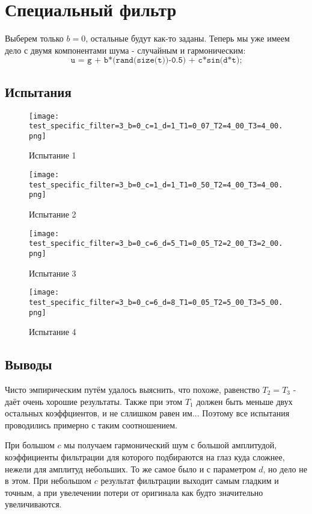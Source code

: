 \section{Специальный фильтр}
Выберем только $b=0$, остальные будут как-то заданы. Теперь мы уже имеем дело с двумя компонентами шума - случайным и гармоническим:
$$
\texttt{u = g + b*(rand(size(t))-0.5) + c*sin(d*t);}
$$
\subsection{Испытания}

\begin{figure}[ht]
    \centering
    \texttt{[image: test\_specific\_filter=3\_b=0\_c=1\_d=1\_T1=0\_07\_T2=4\_00\_T3=4\_00.png]}
	\caption{Испытание 1}
\end{figure}

\begin{figure}[ht]
    \centering
    \texttt{[image: test\_specific\_filter=3\_b=0\_c=1\_d=1\_T1=0\_50\_T2=4\_00\_T3=4\_00.png]}
	\caption{Испытание 2}
\end{figure}
\newpage
\begin{figure}[ht]
    \centering
    \texttt{[image: test\_specific\_filter=3\_b=0\_c=6\_d=5\_T1=0\_05\_T2=2\_00\_T3=2\_00.png]}
	\caption{Испытание 3}
\end{figure}


\begin{figure}[ht]
    \centering
    \texttt{[image: test\_specific\_filter=3\_b=0\_c=6\_d=8\_T1=0\_05\_T2=5\_00\_T3=5\_00.png]}
	\caption{Испытание 4}
\end{figure}


\newpage
\newpage
\subsection{Выводы}
Чисто эмпирическим путём удалось выяснить, что похоже, равенство $T_2=T_3$ - даёт очень хорошие результаты. Также при этом $T_1$ должен быть меньше двух остальных коэффциентов, и не сллишком равен им... Поэтому все испытания проводились примерно с таким соотношением.

При большом $c$ мы получаем гармонический шум с большой амплитудой, коэффициенты фильтрации для которого подбираются на глаз куда сложнее, нежели для амплитуд небольших. То же самое было и с параметром $d$, но дело не в этом. 
При небольшом $c$ результат фильтрации выходит самым гладким и точным, 
а при увелечении потери от оригинала как будто значительно увеличиваются.


\endinput